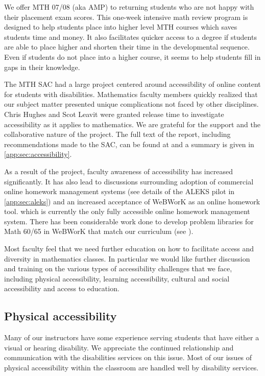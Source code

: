 We offer MTH 07/08 (aka AMP) to returning students who are not happy with their placement exam scores. This one-week intensive math review program is designed to help students place into higher level MTH courses which saves students time and money. It also facilitates quicker access to a degree if students are able to place higher and shorten their time in the developmental sequence.  Even if students do not place into a higher course, it seems to help students fill in gaps in their knowledge.

The MTH SAC had a large project centered around accessibility of online content for students with disabilities. Mathematics faculty members quickly realized that our subject matter presented unique complications not faced by other disciplines. Chris Hughes and Scot Leavit were granted release time to investigate accessibility as it applies to mathematics. We are grateful for the support and the collaborative nature of the project. The full text of the report, including recommendations made to the SAC, can be found at \cite{accessibilityproject} and a summary is given in \vref{app:sec:accessibility}.

As a result of the project, faculty awareness of accessibility has increased significantly. It has also lead to discussions surrounding adoption of commercial online homework management systems (see details of the ALEKS pilot in \vref{app:sec:aleks}) and an increased acceptance of WeBWorK as an online homework tool. which is currently the only fully accessible online homework management system. There has been considerable work done to develop problem libraries for Math 60/65 in WeBWorK that match our curriculum (see ).

Most faculty feel that we need further education on how to facilitate access and diversity in mathematics classes. In particular we would like further discussion and training on the various types of accessibility challenges that we face, including physical accessibility, learning accessibility, cultural and social accessibility and access to education.

\subsection{Physical accessibility}
Many of our instructors have some experience serving students that have either a visual or hearing disability. We appreciate the continued relationship and communication with the disabilities services on this issue. Most of our issues of physical accessibility within the classroom are handled well by disability services. 

